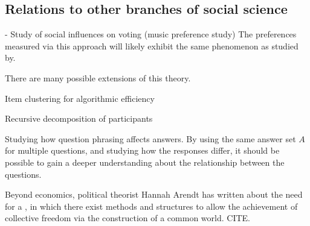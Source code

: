 \subsection{Relations to other branches of social science}

- Study of social influences on voting (music preference study)
The preferences measured via this approach will likely exhibit the same phenomenon as studied by.

There are many possible extensions of this theory.

Item clustering for algorithmic efficiency

Recursive decomposition of participants

Studying how question phrasing affects answers. By using the same answer set $A$ for multiple questions, and studying how the responses differ, it should be possible to gain a deeper understanding about the relationship between the questions.

Beyond economics, political theorist Hannah Arendt has written about the need for a , in which there exist methods and structures to allow the achievement of collective freedom via the construction of a common world. CITE.